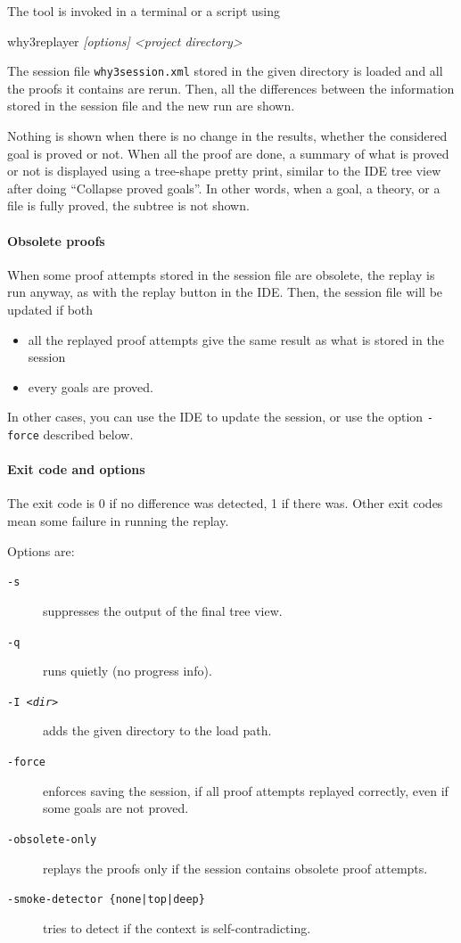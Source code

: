 The tool is invoked in a terminal or a script using
\begin{flushleft}\ttfamily
  why3replayer \textsl{[options] <project directory>}
\end{flushleft}
The session file \texttt{why3session.xml} stored in the given
directory is loaded and all the proofs it contains are rerun. Then,
all the differences between the information stored in the session file and
the new run are shown.

Nothing is shown when there is no change in the results, whether the
considered goal is proved or not. When all the proof
are done, a summary of what is proved or not is displayed using a
tree-shape pretty print, similar to the IDE tree view after doing
``Collapse proved goals''. In other words, when a goal, a theory, or a
file is fully proved, the subtree is not shown.

\paragraph{Obsolete proofs}

When some proof attempts stored in the session file are
obsolete,
the replay is run anyway, as with the replay button in the IDE. Then, the session
file will be updated if both 
\begin{itemize}
\item all the replayed proof attempts give the same result as what
  is stored in the session
\item every goals are proved.
\end{itemize}
In other cases, you can use the IDE to update the session, or use the
option \verb|-force| described below.

\paragraph{Exit code and options}

The exit code is 0 if no difference was detected, 1 if there
was. Other exit codes mean some failure in running the replay.

Options are:
\begin{description}
\item[\texttt{-s}] suppresses the output of the final tree view.
\item[\texttt{-q}] runs quietly (no progress info).
\item[\texttt{-I \textsl{<dir>}}] adds the given directory to the load path.
\item[\texttt{-force}] enforces saving the session, if all proof
  attempts replayed correctly, even if some goals are not proved.
\item[\texttt{-obsolete-only}] replays the proofs only if the session
  contains obsolete proof attempts.
\item[\texttt{-smoke-detector \{none|top|deep\}}] tries to detect
  if the context is self-contradicting.
\end{description}

